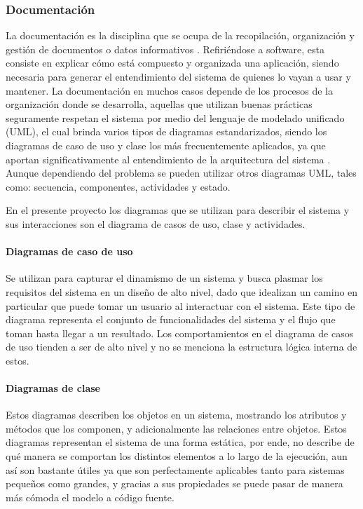 \subsubsection{Documentación}
La documentación es la disciplina que se ocupa de la recopilación, organización y gestión de documentos o datos informativos \parencite{RAEDefDocumentacion}. Refiriéndose a software, esta consiste en explicar cómo está compuesto y organizada una aplicación, siendo necesaria para generar el entendimiento del sistema de quienes lo vayan a usar y mantener. La documentación en muchos casos depende de los procesos de la organización donde se desarrolla, aquellas que utilizan buenas prácticas seguramente respetan el sistema por medio del lenguaje de modelado unificado (UML), el cual brinda varios tipos de diagramas estandarizados, siendo los diagramas de caso de uso y clase los más frecuentemente aplicados, ya que aportan significativamente al entendimiento de la arquitectura del sistema \parencite{Rumbaugh2004}. Aunque dependiendo del problema se pueden utilizar otros diagramas UML, tales como: secuencia, componentes, actividades y estado. 

En el presente proyecto los diagramas que se utilizan para describir el sistema y sus interacciones son el diagrama de casos de uso, clase y actividades.

\paragraph{Diagramas de caso de uso} Se utilizan para capturar el dinamismo de un sistema y busca plasmar los requisitos del sistema en un diseño de alto nivel, dado que idealizan un camino en particular que puede tomar un usuario al interactuar con el sistema. Este tipo de diagrama representa el conjunto de funcionalidades del sistema y el flujo que toman hasta llegar a un resultado. Los comportamientos en el diagrama de casos de uso tienden a ser de alto nivel y no se menciona la estructura lógica interna de estos. 

\paragraph{Diagramas de clase} Estos diagramas describen los objetos en un sistema, mostrando los atributos y métodos que los componen, y adicionalmente las relaciones entre objetos. Estos diagramas representan el sistema de una forma estática, por ende, no describe de qué manera se comportan los distintos elementos a lo largo de la ejecución, aun así son bastante útiles ya que son perfectamente aplicables tanto para sistemas pequeños como grandes, y gracias a sus propiedades se puede pasar de manera más cómoda el modelo a código fuente.

